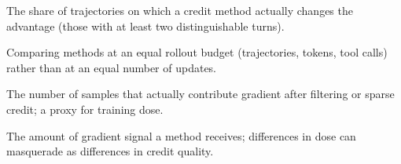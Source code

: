 \begin{description}[leftmargin=0pt,itemsep=1pt,font=\normalfont\bfseries]
  \item[Exposure.] The share of trajectories on which a credit method actually changes the advantage (\eg those with at least two distinguishable turns).
  \item[Matched compute.] Comparing methods at an equal rollout budget (trajectories, tokens, tool calls) rather than at an equal number of updates.
  \item[Effective sample size.] The number of samples that actually contribute gradient after filtering or sparse credit; a proxy for training dose.
  \item[Training dose.] The amount of gradient signal a method receives; differences in dose can masquerade as differences in credit quality.
\end{description}
